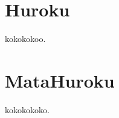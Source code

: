 \documentclass[12pt,epsf]{report}
\begin{document}
\renewcommand{\thesection}{\Alph{section}}
\appendix
{}
\chapter{Huroku}

kokokokoo.

\chapter{MataHuroku}

kokokokoko.

%
\end{document}
